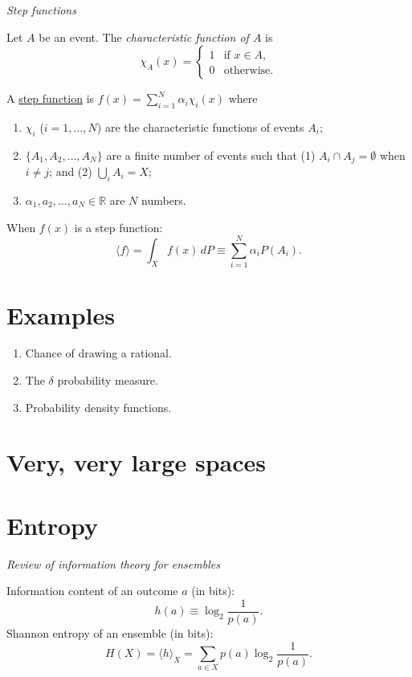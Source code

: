 \documentclass[11pt]{article}
\begin{document}
\emph{Step functions}

Let $A$ be an event. The \emph{characteristic function of $A$} is
\[
\chi_A(x) = \begin{cases}
  1 & \text{if $x\in A$}, \\
  0 & \text{otherwise}.
\end{cases}
\]

A \ul{step function} is $f(x) = \sum_{i=1}^N \alpha_i \chi_i(x)$ where
  \begin{enumerate}
  \item $\chi_i$ ($i=1,\dotsc,N$) are the characteristic functions of events $A_i$;
  \item $\{A_1, A_2, \dotsc, A_N\}$ are a finite number of events such that (1) $A_i
    \cap A_j = \emptyset$ when $i\neq j$; and (2) $\bigcup_i A_i = X$;
  \item $\alpha_1, a_2, \dotsc, a_N \in \mathbb{R}$ are $N$ numbers.
\end{enumerate}

When $f(x)$ is a step function:
\[
\langle f \rangle = \int_X f(x)\,dP \equiv \sum_{i=1}^N \alpha_i P(A_i).
\]

\newpage
\section*{Examples}
\label{slide:examples}
\begin{enumerate}
\item Chance of drawing a rational.
\item The $\delta$ probability measure.
\item Probability density functions.
\end{enumerate}

\newpage
\section*{Very, very large spaces}
\label{slide:largespaces}

\newpage
\section*{Entropy}
\label{slide:entropy}
\emph{Review of information theory for ensembles}

Information content of an outcome $a$ (in bits):
\[
h(a) \equiv \log_2\frac{1}{p(a)}.
\]
Shannon entropy of an ensemble (in bits):
\[
H(X) = \langle h \rangle_X = \sum_{a\in X} p(a) \log_2 \frac{1}{p(a)}.
\]
\end{document}
